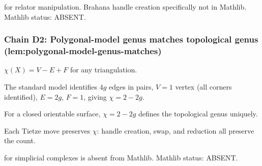 \begin{lemma}
\label{lem:tbh-r5}
 for relator manipulation.  Brahana handle creation specifically not in Mathlib.  Mathlib status: ABSENT.
\leanok
\end{lemma}

\subsubsection*{Chain D2: Polygonal-model genus matches topological genus (lem:polygonal-model-genus-matches)}

\begin{lemma}
\label{lem:pgm-r1}
$\chi(X) = V - E + F$ for any triangulation.
\leanok
\end{lemma}

\begin{lemma}
\label{lem:pgm-r2}
The standard model identifies $4g$ edges in pairs, $V = 1$ vertex (all corners identified), $E = 2g$, $F = 1$, giving $\chi = 2 - 2g$.
\leanok
\end{lemma}

\begin{lemma}
\label{lem:pgm-r3}
For a closed orientable surface, $\chi = 2 - 2g$ defines the topological genus uniquely.
\leanok
\end{lemma}

\begin{lemma}
\label{lem:pgm-r4}
Each Tietze move preserves $\chi$: handle creation, swap, and reduction all preserve the count.
\leanok
\end{lemma}

\begin{lemma}
\label{lem:pgm-r5}
 for simplicial complexes is absent from Mathlib.  Mathlib status: ABSENT.
\leanok
\end{lemma}

